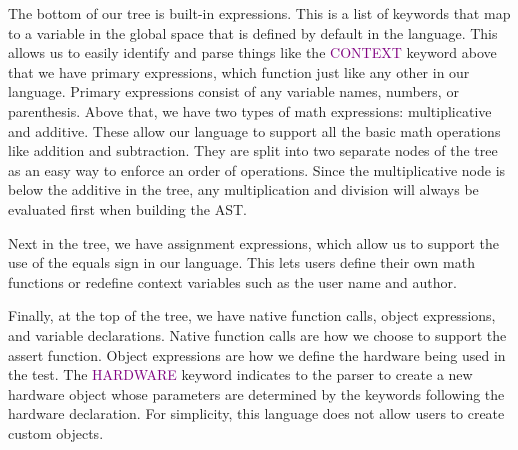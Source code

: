 \documentclass[sigconf,authordraft]{acmart}
\begin{document}
The bottom of our tree is built-in expressions. This is a list of keywords that map to a variable in the global space that is defined by default in the language. This allows us to easily identify and parse things like the \textcolor{purple}{CONTEXT} keyword above that we have primary expressions, which function just like any other in our language. Primary expressions consist of any variable names, numbers, or parenthesis. Above that, we have two types of math expressions: multiplicative and additive. These allow our language to support all the basic math operations like addition and subtraction. They are split into two separate nodes of the tree as an easy way to enforce an order of operations. Since the multiplicative node is below the additive in the tree, any multiplication and division will always be evaluated first when building the AST. 

Next in the tree, we have assignment expressions, which allow us to support the use of the equals sign in our language. This lets users define their own math functions or redefine context variables such as the user name and author.

Finally, at the top of the tree, we have native function calls, object expressions, and variable declarations. Native function calls are how we choose to support the assert function. Object expressions are how we define the hardware being used in the test. The \textcolor{purple}{HARDWARE} keyword indicates to the parser to create a new hardware object whose parameters are determined by the keywords following the hardware declaration. For simplicity, this language does not allow users to create custom objects. 
\end{document}
